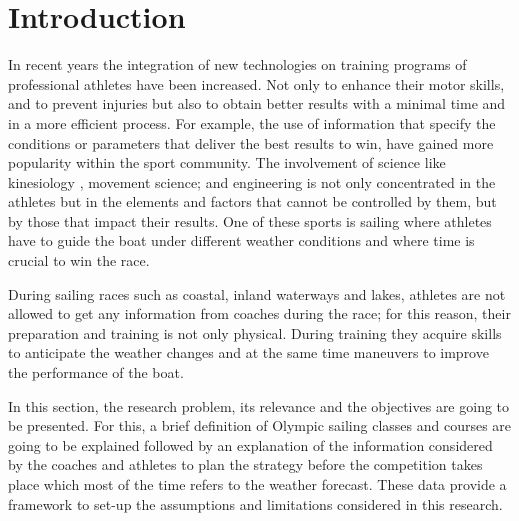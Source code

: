 \chapter{Introduction}


In recent years the integration of new technologies on training programs of professional athletes have been increased. Not only to enhance their motor skills, and to prevent injuries but also to obtain better results with a minimal time and in a more efficient process. For example, the use of information that specify the conditions or parameters that deliver the best results to win, have gained more popularity within the sport community. The involvement of science like kinesiology \cite{sjogaard2015science}, movement science; and engineering is not only concentrated in the athletes but in the elements and factors that cannot be controlled by them, but by those that impact their results. One of these sports is sailing where athletes have to guide the boat under different weather conditions and where time is crucial to win the race.\par
During sailing races such as coastal, inland waterways and lakes, athletes are not allowed to get any information from coaches during the race; for this reason, their preparation and training is not only physical. During training they acquire skills to anticipate the weather changes and at the same time maneuvers to improve the performance of the boat. \par
In this section, the research problem, its relevance and the objectives are going to be presented. For this, a brief definition of Olympic sailing classes and courses are going to be explained followed by an explanation of the information considered by the coaches and athletes to plan the strategy before the competition takes place which most of the time refers to the weather forecast. These data provide a framework to set-up the assumptions and limitations considered in this research. \par 
